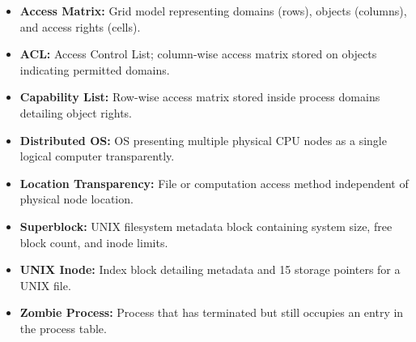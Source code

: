\documentclass[12pt,a4paper]{article}
\begin{document}
\begin{tcolorbox}[defbox, title={\textbf{One-Line Definitions}}]
\begin{itemize}[leftmargin=*, itemsep=2.5pt, topsep=0pt]
  \item \textbf{Access Matrix:} Grid model representing domains (rows), objects (columns), and access rights (cells).
  \item \textbf{ACL:} Access Control List; column-wise access matrix stored on objects indicating permitted domains.
  \item \textbf{Capability List:} Row-wise access matrix stored inside process domains detailing object rights.
  \item \textbf{Distributed OS:} OS presenting multiple physical CPU nodes as a single logical computer transparently.
  \item \textbf{Location Transparency:} File or computation access method independent of physical node location.
  \item \textbf{Superblock:} UNIX filesystem metadata block containing system size, free block count, and inode limits.
  \item \textbf{UNIX Inode:} Index block detailing metadata and 15 storage pointers for a UNIX file.
  \item \textbf{Zombie Process:} Process that has terminated but still occupies an entry in the process table.
\end{itemize}
\end{tcolorbox}
\end{document}
